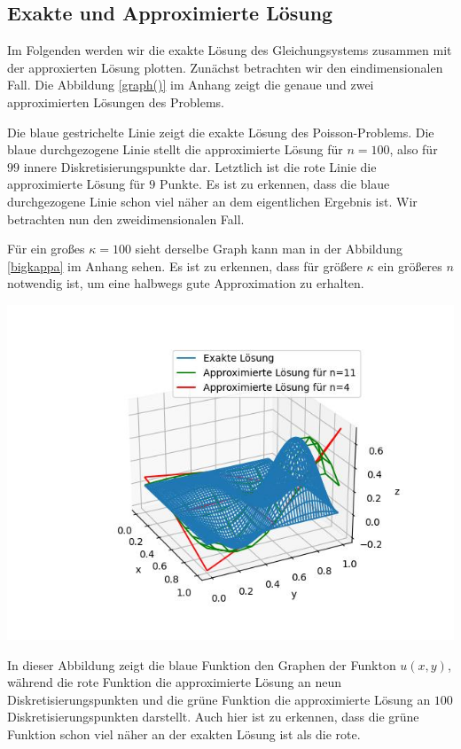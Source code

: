 \documentclass[smallheadings]{scrartcl}
\theoremstyle{definition}
\begin{document}
	\subsection{Exakte und Approximierte Lösung}
Im Folgenden werden wir die exakte Lösung des Gleichungsystems zusammen mit der approxierten Lösung plotten. Zunächst betrachten wir den eindimensionalen Fall. Die Abbildung \ref{graph()} im Anhang zeigt die genaue und zwei approximierten Lösungen des Problems.




Die blaue gestrichelte Linie zeigt die exakte Lösung des Poisson-Problems. Die blaue durchgezogene Linie stellt die approximierte Lösung für $n=100$, also für $99$ innere Diskretisierungspunkte dar. Letztlich ist die rote Linie die approximierte Lösung für $9$ Punkte. Es ist zu erkennen, dass die blaue durchgezogene Linie schon viel näher an dem eigentlichen Ergebnis ist. Wir betrachten nun den zweidimensionalen Fall. 

Für ein großes $\kappa =100$ sieht derselbe Graph kann man in der Abbildung \ref{bigkappa} im Anhang sehen. Es ist zu erkennen, dass für größere $\kappa$ ein größeres $n$ notwendig ist, um eine halbwegs gute Approximation zu erhalten.


\begin{minipage}{\textwidth}
\centering
\includegraphics[scale = 0.6]{3D}
	\label{3d}
\end{minipage}
In dieser Abbildung zeigt die blaue Funktion den Graphen der Funkton $u(x,y)$, während die rote Funktion die approximierte Lösung an neun Diskretisierungspunkten und die grüne Funktion die approximierte Lösung an $100$ Diskretisierungspunkten darstellt. Auch hier ist zu erkennen, dass die grüne Funktion schon viel näher an der exakten Lösung ist als die rote.
\end{document}
